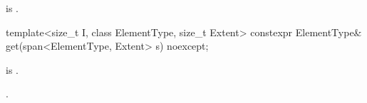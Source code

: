 \begin{itemdescr}
\pnum
\mandates
{} is .
\end{itemdescr}

%
\begin{itemdecl}
template<size_t I, class ElementType, size_t Extent>
  constexpr ElementType& get(span<ElementType, Extent> s) noexcept;
\end{itemdecl}

\begin{itemdescr}
\pnum
\mandates
{} is .

\pnum
\returns
{}.
\end{itemdescr}
